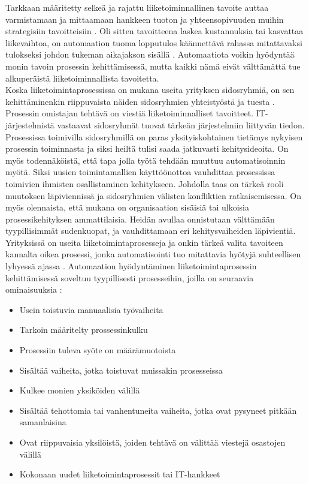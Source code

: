 \documentclass[finnish,12pt,a4paper,pdftex]{article}
\begin{document}
\noindent Tarkkaan määritetty selkeä ja rajattu liiketoiminnallinen tavoite auttaa varmistamaan ja mittaamaan hankkeen tuoton ja yhteensopivuuden muihin strategisiin tavoitteisiin \citep{mohapatra}. Oli sitten tavoitteena laskea kustannuksia tai kasvattaa liikevaihtoa, on automaation tuoma lopputulos käännettävä rahassa mitattavaksi tulokseksi johdon tukeman aikajakson sisällä \citep{clarkin}. Automaatiota voikin hyödyntää monin tavoin prosessin kehittämisessä, mutta kaikki nämä eivät välttämättä tue alkuperäistä liiketoiminnallista tavoitetta.\\

\noindent Koska liiketoimintaprosessissa on mukana useita yrityksen sidosryhmiä, on sen kehittäminenkin riippuvaista näiden sidosryhmien yhteistyöstä ja tuesta \citep{clarkin, mohapatra}. Prosessin omistajan tehtävä on viestiä liiketoiminnalliset tavoitteet. IT-järjestelmistä vastaavat sidosryhmät tuovat tärkeän järjestelmiin liittyvän tiedon. Prosessissa toimivilla sidosryhmillä on paras yksityiskohtainen tietämys nykyisen prosessin toiminnasta ja siksi heiltä tulisi saada jatkuvasti kehitysideoita. On myös todennäköistä, että tapa jolla työtä tehdään muuttuu automatisoinnin myötä. Siksi uusien toimintamallien käyttöönottoa vauhdittaa prosessissa toimivien ihmisten osallistaminen kehitykseen. Johdolla taas on tärkeä rooli muutoksen läpiviennissä ja sidosryhmien välisten konfliktien ratkaisemisessa. On myös olennaista, että mukana on organisaation sisäisiä tai ulkoisia prosessikehityksen ammattilaisia. Heidän avullaa onnistutaan välttämään tyypillisimmät sudenkuopat, ja vauhdittamaan eri kehitysvaiheiden läpivientiä.\\

\noindent Yrityksissä on useita liiketoimintaprosesseja ja onkin tärkeä valita tavoiteen kannalta oikea prosessi, jonka automatisointi tuo mitattavia hyötyjä suhteellisen lyhyessä ajassa \citep{mohapatra}. Automaation hyödyntäminen liiketoimintaprosessin kehittämisessä soveltuu tyypillisesti prosesseihin, joilla on seuraavia ominaisuuksia \citep{clarkin, mohapatra}:

\begin{itemize}
\setlength{\itemsep}{0pt}
    \item Usein toistuvia manuaalisia työvaiheita
    \item Tarkoin määritelty prossessinkulku
    \item Prosessiin tuleva syöte on määrämuotoista
    \item Sisältää vaiheita, jotka toistuvat muissakin prosesseissa
    \item Kulkee monien yksiköiden välillä
    \item Sisältää tehottomia tai vanhentuneita vaiheita, jotka ovat pysyneet pitkään samanlaisina
    \item Ovat riippuvaisia yksilöistä, joiden tehtävä on välittää viestejä osastojen välillä
    \item Kokonaan uudet liiketoimintaprosessit tai IT-hankkeet
\end{itemize}
\end{document}
